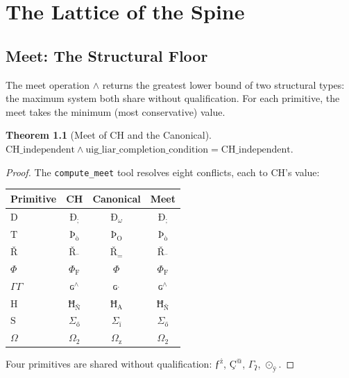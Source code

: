 \documentclass[12pt,twoside]{book}
\newtheorem{theorem}{Theorem}[chapter]
\theoremstyle{definition}
\newcommand{\prim}[1]{\text{#1}}
\begin{document}
\chapter{The Lattice of the Spine}

\section{Meet: The Structural Floor}

The meet operation $\wedge$ returns the greatest lower bound of two structural types: the maximum system both share without qualification. For each primitive, the meet takes the minimum (most conservative) value.

\begin{theorem}[Meet of CH and the Canonical]
$\text{CH\_independent} \wedge \text{uig\_liar\_completion\_condition} = \text{CH\_independent}.$
\end{theorem}

\begin{proof}
The \texttt{compute\_meet} tool resolves eight conflicts, each to CH's value:
\begin{center}
\begin{tabular}{lccc}
\toprule
\textbf{Primitive} & \textbf{CH} & \textbf{Canonical} & \textbf{Meet} \\
\midrule
$\prim{D}$ & $\text{Ð}_{\text{;}}$ & $\text{Ð}_{\omega}$ & $\text{Ð}_{\text{;}}$ \\
$\prim{T}$ & $\text{Þ}_{\text{ò}}$ & $\text{Þ}_{\text{O}}$ & $\text{Þ}_{\text{ò}}$ \\
$\text{Ř}$ & $\text{Ř}_{\text{¯}}$ & $\text{Ř}_{\text{=}}$ & $\text{Ř}_{\text{¯}}$ \\
$\Phi$ & $\Phi_{\text{F}}$ & $\Phi_{\text{}}$ & $\Phi_{\text{F}}$ \\
$\Gamma \!\!\! \Gamma$ & $\text{ɢ}^{\land}$ & $\text{ɢ}^{\text{ˌ}}$ & $\text{ɢ}^{\land}$ \\
$\prim{H}$ & $\text{Ħ}_{\text{Ñ}}$ & $\text{Ħ}_{\text{A}}$ & $\text{Ħ}_{\text{Ñ}}$ \\
$\prim{S}$ & $\Sigma_{\text{ő}}$ & $\Sigma_{\text{ï}}$ & $\Sigma_{\text{ő}}$ \\
$\Omega$ & $\Omega_{\text{2}}$ & $\Omega_{\text{z}}$ & $\Omega_{\text{2}}$ \\
\bottomrule
\end{tabular}
\end{center}
Four primitives are shared without qualification: $\text{ƒ}^{\text{ż}}$, $\text{Ç}^{\text{@}}$, $\Gamma_{\text{ʔ}}$, $\odot_{\text{ÿ}}$.
\end{proof}
\end{document}
